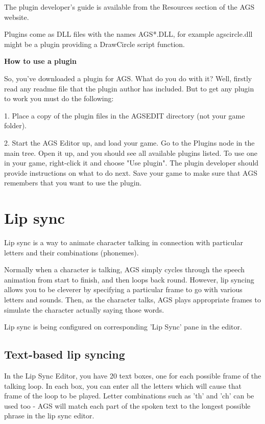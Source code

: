 The plugin developer's guide is available from the Resources section of the AGS website.

Plugins come as DLL files with the names  AGS*.DLL, for example  agscircle.dll  might be a
plugin providing a DrawCircle script function.

\bf{How to use a plugin}

So, you've downloaded a plugin for AGS. What do you do with it?
Well, firstly read any readme file that the plugin author has included. But to get
any plugin to work you must do the following:

1. Place a copy of the plugin files in the AGSEDIT directory (not your game folder).

2. Start the AGS Editor up, and load your game. Go to the Plugins node in the main tree.
Open it up, and you should see all available plugins listed. To use one in your game,
right-click it and choose "Use plugin". The plugin developer should provide
instructions on what to do next. Save your game to make sure that AGS remembers
that you want to use the plugin.

\section{Lip sync}%

Lip sync is a way to animate character talking in connection with particular letters and their combinations (phonemes).

Normally when a character is talking, AGS simply cycles through the speech animation
from start to finish, and then loops back round. However, lip syncing allows you to be
cleverer by specifying a particular frame to go with various letters and sounds. Then,
as the character talks, AGS plays appropriate frames to simulate the character actually
saying those words.

Lip sync is being configured on corresponding 'Lip Sync' pane in the editor.

\subsection{Text-based lip syncing}%

In the Lip Sync Editor, you have 20 text boxes, one for each possible frame of the
talking loop. In each box, you can enter all the letters which will cause that frame of
the loop to be played. Letter combinations such as 'th' and 'ch' can be used too - AGS
will match each part of the spoken text to the longest possible phrase in the lip sync
editor.

